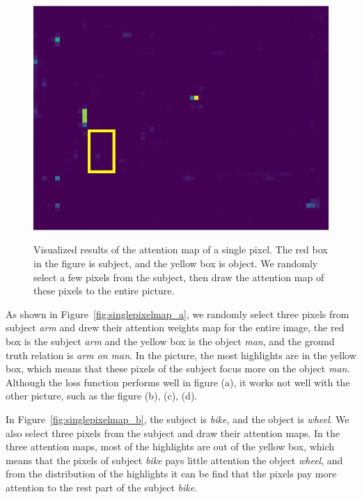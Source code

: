 \begin{figure}[h!]
{\begin{minipage}[t]{3.5cm}
		\end{minipage}
		\begin{minipage}[t]{3.5cm}
			\centering
			\includegraphics[width=0.9\linewidth]{figures/pixel/map5_3}
		\end{minipage}
		\label{fig:singlepixelmap_d}}
	
	\caption[Visualized results of the attention map of a single pixel ]{Visualized results of the attention map of a single pixel. The red box in the figure is subject, and the yellow box is object. We randomly select a few pixels from the subject, then draw the attention map of these pixels to the entire picture. }
	\label{fig:singlepixelmap}
\end{figure}

As shown in Figure~\ref{fig:singlepixelmap_a}, we randomly select three pixels from subject \textit{arm} and drew their attention weights map for the entire image, the red box is the subject \textit{arm} and the yellow box is the object\textit{ man}, and the ground truth relation is \textit{arm on man}. In the picture, the most highlights are in the yellow box, which means that these pixels of the subject focus more on the object \textit{man}. Although the loss function performs well in figure (a), it works not well with the other picture, such as the figure (b), (c), (d).

In Figure~\ref{fig:singlepixelmap_b}, the subject is \textit{bike}, and the object is \textit{wheel}. We also select three pixels from the subject and draw their attention maps. In the three attention maps, most of the highlights are out of the yellow box, which means that the pixels of subject \textit{bike} pays little attention the object \textit{wheel}, and from the distribution of the highlights it can be find that the pixels pay more attention to the rest part of the subject \textit{bike}.


